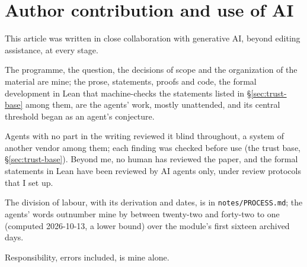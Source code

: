 %

\section*{Author contribution and use of AI}

This article was written in close collaboration with generative AI, beyond editing assistance, at
every stage.

The programme, the question, the decisions of scope and the organization of the material are mine;
the prose, statements, proofs and code, the formal development in Lean that machine-checks the
statements listed in \S\ref{sec:trust-base} among them, are the agents' work, mostly unattended,
and its central threshold began as an agent's conjecture.

Agents with no part in the writing reviewed it blind throughout, a system of another vendor among
them; each finding was checked before use (the trust base, \S\ref{sec:trust-base}). Beyond me, no
human has reviewed the paper, and the formal statements in Lean have been reviewed by AI agents
only, under review protocols that I set up.

The division of labour, with its derivation and dates, is in \texttt{notes/PROCESS.md}; the agents'
words outnumber mine by between twenty-two and forty-two to one (computed 2026-10-13, a lower bound)
over the module's first sixteen archived days.

Responsibility, errors included, is mine alone.
